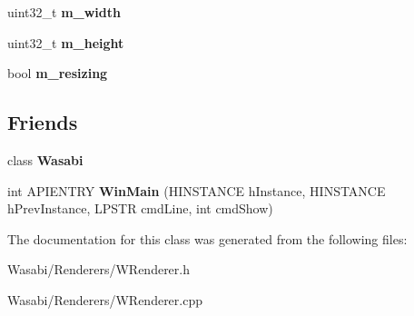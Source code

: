\begin{DoxyCompactItemize}
\item 
uint32\+\_\+t {\bfseries m\+\_\+width}\hypertarget{class_w_renderer_aa0e93b3e94a7d4281e3509585ec9ad64}{}\label{class_w_renderer_aa0e93b3e94a7d4281e3509585ec9ad64}

\item 
uint32\+\_\+t {\bfseries m\+\_\+height}\hypertarget{class_w_renderer_a65a01e8c541266896bf8e69056822431}{}\label{class_w_renderer_a65a01e8c541266896bf8e69056822431}

\item 
bool {\bfseries m\+\_\+resizing}\hypertarget{class_w_renderer_a0335d8da66f197638829056f89daac37}{}\label{class_w_renderer_a0335d8da66f197638829056f89daac37}

\end{DoxyCompactItemize}
\subsection*{Friends}
\begin{DoxyCompactItemize}
\item 
class {\bfseries Wasabi}\hypertarget{class_w_renderer_a0c8bd63565774772e7ab86a1bdeb6e69}{}\label{class_w_renderer_a0c8bd63565774772e7ab86a1bdeb6e69}

\item 
int A\+P\+I\+E\+N\+T\+RY {\bfseries Win\+Main} (H\+I\+N\+S\+T\+A\+N\+CE h\+Instance, H\+I\+N\+S\+T\+A\+N\+CE h\+Prev\+Instance, L\+P\+S\+TR cmd\+Line, int cmd\+Show)\hypertarget{class_w_renderer_a09086b520e174cf7af5b8763227eaac6}{}\label{class_w_renderer_a09086b520e174cf7af5b8763227eaac6}

\end{DoxyCompactItemize}


The documentation for this class was generated from the following files\+:\begin{DoxyCompactItemize}
\item 
Wasabi/\+Renderers/W\+Renderer.\+h\item 
Wasabi/\+Renderers/W\+Renderer.\+cpp\end{DoxyCompactItemize}
